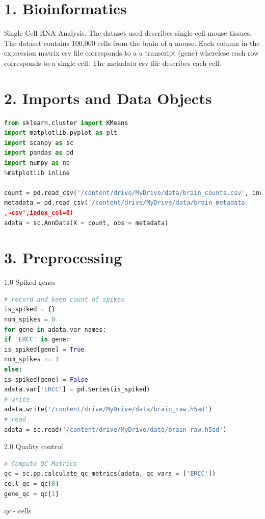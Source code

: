 \documentclass{article}
\begin{document}
\newpage

\section*{ 1. Bioinformatics}

\begin{question}
    
Single Cell RNA Analysis. The dataset used describes single-cell mouse tissues. The dataset
contains 100,000 cells from the brain of a mouse. Each column in the expression matrix csv file
corresponds to a a transcript (gene) wherelese each row corresponds to a single cell. The metadata
csv file describes each cell.

\end{question}
    
\section*{2. Imports and Data Objects}
   

\begin{lstlisting}[language=Python]
from sklearn.cluster import KMeans
import matplotlib.pyplot as plt
import scanpy as sc
import pandas as pd
import numpy as np
%matplotlib inline

count = pd.read_csv('/content/drive/MyDrive/data/brain_counts.csv', index_col=0)
metadata = pd.read_csv('/content/drive/MyDrive/data/brain_metadata.
,→csv',index_col=0)
adata = sc.AnnData(X = count, obs = metadata)

\end{lstlisting}

\section*{3. Preprocessing}

1.0 Spiked genes
\begin{lstlisting}[language=Python]
# record and keep count of spikes
is_spiked = {}
num_spikes = 0
for gene in adata.var_names:
if 'ERCC' in gene:
is_spiked[gene] = True
num_spikes += 1
else:
is_spiked[gene] = False
adata.var['ERCC'] = pd.Series(is_spiked)
# write
adata.write('/content/drive/MyDrive/data/brain_raw.h5ad')
# read
adata = sc.read('/content/drive/MyDrive/data/brain_raw.h5ad')
\end{lstlisting}

2.0 Quality control
\begin{lstlisting}[language=Python]
# Compute QC Metrics
qc = sc.pp.calculate_qc_metrics(adata, qc_vars = ['ERCC'])
cell_qc = qc[0]
gene_qc = qc[1]

\end{lstlisting}
 qc - cells
\end{document}
